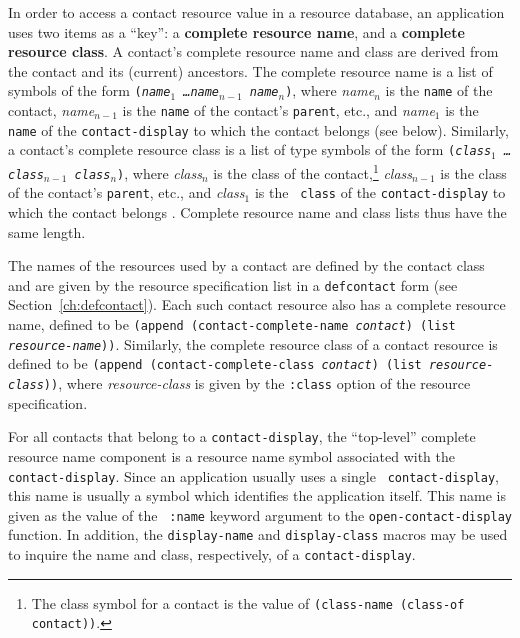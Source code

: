 In order to access a contact resource value in a resource database, an
application uses two items as a ``key'': a {\bf complete resource name},
and a {\bf complete resource class}. A
contact's complete resource
name and class are derived from the contact and its (current) ancestors. The
complete resource name is a list of symbols of the form {\tt ({\em name$_{1}$
\ldots name$_{n-1}$  name$_{n}$})}, where {\em name$_{n}$} is the
{\tt name} of the contact, {\em name$_{n-1}$} is the {\tt name} of
the contact's {\tt parent}, etc., and {\em name$_{1}$} is the {\tt
name} of the {\tt contact-display} to which the contact belongs (see below).
Similarly, a contact's complete resource class is a list of type symbols of the form
{\tt ({\em class$_{1}$
\ldots class$_{n-1}$  class$_{n}$})}, where {\em class$_{n}$} is the
class of the contact,\footnote{The class symbol for a contact is the value
of {\tt (class-name (class-of contact))}.} 
{\em class$_{n-1}$} is the class of
the contact's {\tt parent}, etc., and {\em class$_{1}$} is the {\tt
class} of
the {\tt contact-display} to which the contact belongs \footnotemark
{}.  Complete resource name and class lists thus have the same length. 

The names of the resources used by a contact are defined by the contact class
and are given by the resource specification list 
in a {\tt defcontact} form (see Section~\ref{ch:defcontact}). Each such contact
resource also has a complete resource name, defined to be {\tt (append
(contact-complete-name {\em contact}) (list {\em
resource-name}))}. Similarly, the complete resource
class of a contact resource is defined to be {\tt (append
(contact-complete-class {\em contact})
(list {\em resource-class}))}, where {\em resource-class} is given by the
{\tt :class} option of the resource specification.

For all contacts that belong
to a {\tt contact-display}, the ``top-level'' complete resource name component
is a resource name symbol associated with the {\tt
contact-display}. Since an application usually uses a single {\tt
contact-display}, this name is usually a symbol which identifies the
application itself.  This name is given as the value of the {\tt
:name} keyword argument to the {\tt open-contact-display} function. 
In addition,
the {\tt display-name} and {\tt display-class}
macros may be used to inquire  the name and class, respectively, of a
{\tt contact-display}.

